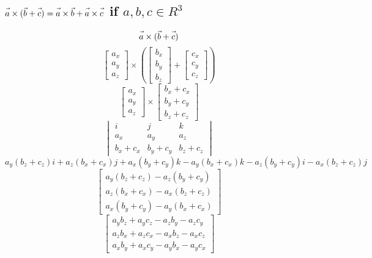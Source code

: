 \documentclass{article}
\newcommand{\fvec}[1]{\vec{\vphantom{A}#1}}
\begin{document}
\subsection{$ \fvec{a} \times (\fvec{b} + \fvec{c}) = \fvec{a} \times \fvec{b} + \fvec{a} \times \fvec{c} $ if $ a, b, c \in R^{3} $}
$$ \fvec{a} \times (\fvec{b} + \fvec{c}) $$
$$ \begin{bmatrix} a_{x} \\ a_{y} \\ a_{z} \end{bmatrix} \times
    \left(\begin{bmatrix} b_{x} \\ b_{y} \\ b_{z} \end{bmatrix} + 
    \begin{bmatrix} c_{x} \\ c_{y} \\ c_{z} \end{bmatrix}\right) $$
$$ \begin{bmatrix} a_{x} \\ a_{y} \\ a_{z} \end{bmatrix} \times
    \begin{bmatrix} b_{x} + c_{x} \\ b_{y} + c_{y} \\ b_{z} + c_{z} \end{bmatrix} $$
$$ \begin{vmatrix}
    i & j & k \\
    a_{x} & a_{y} & a_{z} \\
    b_{x} + c_{x} & b_{y} + c_{y} & b_{z} + c_{z}
\end{vmatrix} $$
$$ a_{y}(b_{z} + c_{z})i + a_{z}(b_{x} + c_{x})j + a_{x}(b_{y} + c_{y})k - a_{y}(b_{x} + c_{x})k - a_{z}(b_{y} + c_{y})i - a_{x}(b_{z} + c_{z})j $$
$$ \begin{bmatrix}
    a_{y}(b_{z} + c_{z}) - a_{z}(b_{y} + c_{y}) \\
    a_{z}(b_{x} + c_{x}) - a_{x}(b_{z} + c_{z}) \\
    a_{x}(b_{y} + c_{y}) - a_{y}(b_{x} + c_{x})
\end{bmatrix} $$
$$ \begin{bmatrix}
    a_{y}b_{z} + a_{y}c_{z} - a_{z}b_{y} - a_{z}c_{y} \\
    a_{z}b_{x} + a_{z}c_{x} - a_{x}b_{z} - a_{x}c_{z} \\
    a_{x}b_{y} + a_{x}c_{y} - a_{y}b_{x} - a_{y}c_{x}
\end{bmatrix} $$
\end{document}
